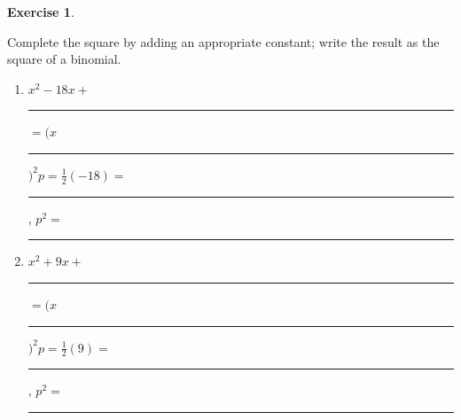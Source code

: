 \documentclass[10pt,]{book}
\newcommand{\fillin}[1]{\rule{#1em}{0.1ex}}
\theoremstyle{plain}
\theoremstyle{definition}
\theoremstyle{definition}
\theoremstyle{definition}
\newtheorem{exercise}[theorem]{Exercise}
\begin{document}
\begin{exercise}\label{exercise-completing-the-square}

		Complete the square by adding an appropriate constant; write the result as the square of a binomial.
		\leavevmode%
\begin{enumerate}[label=*\alph**]
\item\hypertarget{li-22}{}\(x^2 − 18x{} + {}\)\fillin{2.727272727272727}\({}= (x{}\)\fillin{2.727272727272727}\( )^2\)\(p=\frac{1}{2}(-18)={}\)\fillin{2.727272727272727}, \(p^2={}\)\fillin{2.727272727272727}\item\hypertarget{li-23}{}\(x^2 +9x{} + {}\)\fillin{2.727272727272727}\({}= (x{}\)\fillin{2.727272727272727}\( )^2\)\(p=\frac{1}{2}(9)={}\)\fillin{2.727272727272727}, \(p^2={}\)\fillin{2.727272727272727}\end{enumerate}

\end{exercise}
\typeout{************************************************}
\typeout{************************************************}
\end{document}
